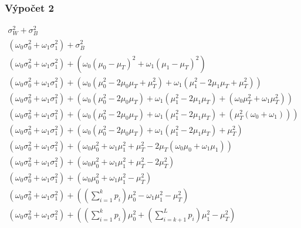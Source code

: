 \documentclass[12pt, a4paper]{report}
\begin{document}
\newpage
\subsubsection*{Výpočet 2}
\begin{eqnarray}
	\sigma_W^2 + \sigma_B^2\\
	\left( \omega_0 \sigma_0^2 + \omega_1 \sigma_1^2 \right) + \sigma_B^2\\
	\left( \omega_0 \sigma_0^2 + \omega_1 \sigma_1^2 \right) + \left( \omega_0 \left( \mu_0 - \mu_T \right)^2 + \omega_1 \left( \mu_1 - \mu_T \right)^2 \right)\\
	\left( \omega_0 \sigma_0^2 + \omega_1 \sigma_1^2 \right) + 	\left( \omega_0 \left( \mu_0^2 - 2 \mu_0 \mu_T + \mu_T^2 \right) + \omega_1 \left( \mu_1^2 - 2 \mu_1 \mu_T  + \mu_T^2 \right) \right)\\	
	\left( \omega_0 \sigma_0^2 + \omega_1 \sigma_1^2 \right) + \left( \omega_0 \left( \mu_0^2 - 2 \mu_0 \mu_T  \right) + \omega_1 \left( \mu_1^2 - 2 \mu_1 \mu_T \right) + \left(\omega_0 \mu_T^2 + \omega_1 \mu_T^2 \right) \right) \\
	\left( \omega_0 \sigma_0^2 + \omega_1 \sigma_1^2 \right) + \left( \omega_0 \left( \mu_0^2 - 2 \mu_0 \mu_T  \right) + \omega_1 \left( \mu_1^2 - 2 \mu_1 \mu_T \right) + \left(\mu_T^2 \left( \omega_0 + \omega_1 \right) \right) \right) \\
	\left( \omega_0 \sigma_0^2 + \omega_1 \sigma_1^2 \right) + \left( \omega_0 \left( \mu_0^2 - 2 \mu_0 \mu_T  \right) + \omega_1 \left( \mu_1^2 - 2 \mu_1 \mu_T \right) + \mu_T^2 \right) \\	
	\left( \omega_0 \sigma_0^2 + \omega_1 \sigma_1^2 \right) + \left( \omega_0 \mu_0^2 + \omega_1 \mu_1^2 + \mu_T^2 - 2 \mu_T \left( \omega_0 \mu_0 + \omega_1 \mu_1 \right) \right)\\
	\left( \omega_0 \sigma_0^2 + \omega_1 \sigma_1^2 \right) + \left( \omega_0 \mu_0^2 + \omega_1 \mu_1^2 + \mu_T^2 - 2 \mu_T^2 \right)\\
	\left( \omega_0 \sigma_0^2 + \omega_1 \sigma_1^2 \right) + \left( \omega_0 \mu_0^2 + \omega_1 \mu_1^2 - \mu_T^2 \right)\\
	\left( \omega_0 \sigma_0^2 + \omega_1 \sigma_1^2 \right) + \left( \left( \sum_{i = 1}^{k} p_i \right) \mu_0^2 - \omega_1 \mu_1^2 - \mu_T^2 \right) \\
	\left( \omega_0 \sigma_0^2 + \omega_1 \sigma_1^2 \right) + \left( \left( \sum_{i = 1}^{k} p_i \right) \mu_0^2 +  \left( \sum_{i = k + 1}^{L} p_i \right) \mu_1^2 - \mu_T^2 \right) \\

\end{eqnarray}
\end{document}
